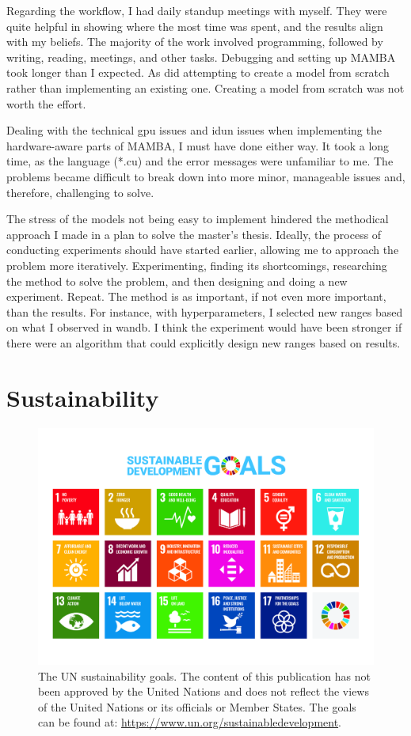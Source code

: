 Regarding the workflow, I had daily standup meetings with myself. They were quite helpful in showing where the most time was spent, and the results align with my beliefs. The majority of the work involved programming, followed by writing, reading, meetings, and other tasks. Debugging and setting up MAMBA took longer than I expected. As did attempting to create a model from scratch rather than implementing an existing one. Creating a model from scratch was not worth the effort. 

Dealing with the technical \acrshort{gpu} issues and \acrshort{idun} issues when implementing the hardware-aware parts of MAMBA, I must have done either way. It took a long time, as the language (*.cu) and the error messages were unfamiliar to me. The problems became difficult to break down into more minor, manageable issues and, therefore, challenging to solve. 

The stress of the models not being easy to implement hindered the methodical approach I made in a plan to solve the master's thesis. Ideally, the process of conducting experiments should have started earlier, allowing me to approach the problem more iteratively. Experimenting, finding its shortcomings, researching the method to solve the problem, and then designing and doing a new experiment. Repeat. The method is as important, if not even more important, than the results. For instance, with hyperparameters, I selected new ranges based on what I observed in \acrfull{wandb}. I think the experiment would have been stronger if there were an algorithm that could explicitly design new ranges based on results.

\section{Sustainability}

\begin{figure}
    \centering
    \includegraphics[width=1\linewidth]{figures/un_poster.jpg}
    \caption{The UN sustainability goals. The content of this publication has not been approved by the United Nations and does not reflect the views of the United Nations or its officials or Member States. The goals can be found at: \url{https://www.un.org/sustainabledevelopment}.}
    \label{fig:sdg}
\end{figure}

